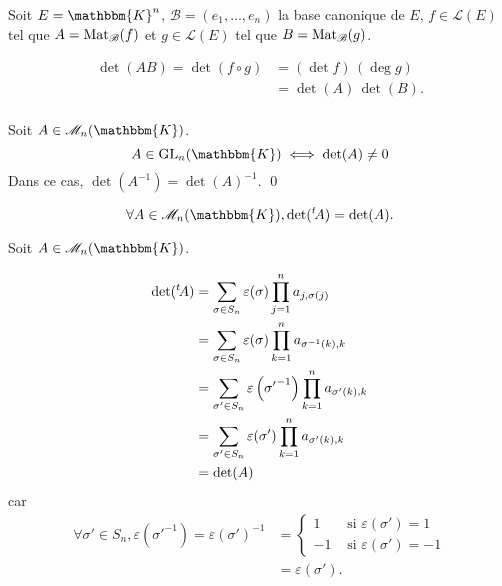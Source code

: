 \begin{prv}
	Soit $E = \mathbbm{K}^n$, $\mathcal{B} = (e_1, \ldots, e_n)$ la base canonique de $E$, $f \in \mathcal{L}(E)$ tel que $A = \operatorname{Mat}_\mathcal{B}(f)$ et $g \in \mathcal{L}(E)$ tel que $B = \operatorname{Mat}_\mathcal{B}(g)$.

	\begin{align*}
		\det(AB) = \det(f \circ g) &= (\det f)\,(\deg g)\\
		&= \det(A)\,\det(B). \\
	\end{align*}
\end{prv}

\begin{prop}
	Soit $A \in \mathcal{M}_n(\mathbbm{K})$. \[
		A \in \mathrm{GL}_n(\mathbbm{K}) \iff \det(A) \neq 0
	\] Dans ce cas, $\det(A^{-1}) = \det(A)^{-1}$.
	\qed
\end{prop}

\begin{prop}
	\[
		\forall A \in \mathcal{M}_n(\mathbbm{K}), \det(\t A) = \det(A).
	\]
\end{prop}

\begin{prv}
	Soit $A \in \mathcal{M}_n(\mathbbm{K})$.

	\begin{align*}
		\operatorname{det}({}^t\! A) &= \sum_{\sigma \in S_n} \varepsilon(\sigma) \prod_{j=1}^n a_{j, \sigma(j)}\\
		&= \sum_{\sigma \in S_n} \varepsilon(\sigma) \prod_{k=1}^n a_{\sigma^{-1}(k), k}  \\
		&= \sum_{\sigma' \in S_n}\varepsilon\left({\sigma'}^{-1}\right) \prod_{k=1}^n a_{\sigma'(k), k} \\
		&= \sum_{\sigma' \in S_n} \varepsilon(\sigma') \prod_{k=1}^n a_{\sigma'(k),k} \\
		&= \operatorname{det}(A) \\
	\end{align*}
	car
	\begin{align*}
		\forall \sigma' \in S_n, \varepsilon\left( {\sigma'}^{-1} \right) = \varepsilon(\sigma')^{-1} &= \begin{cases}
			1 &\text{ si } \varepsilon(\sigma') = 1\\
			-1 &\text{ si } \varepsilon(\sigma') = -1
		\end{cases} \\
		&= \varepsilon(\sigma').
	\end{align*}
\end{prv}

